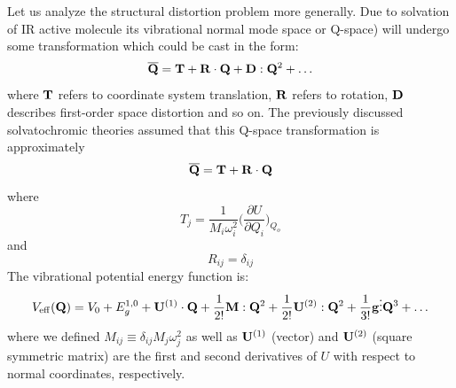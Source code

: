 \documentclass[a4paper,titlepage,twoside,fleqn,12pt]{book}
\newcommand{\FDer}[3]{\ensuremath{
\bigg(
\frac{\partial #1}{\partial #2}
\bigg)_{#3}}}
\begin{document}
\begin{refsection}
Let us analyze the structural distortion problem more generally.
Due to solvation of IR active molecule its vibrational normal mode space 
or Q-space) will
undergo some transformation which could be cast in the form:
%
\begin{equation}\label{Q-space-transform}
{\bf \overline{Q}} = {\bf T} + {\bf R} \cdot {\bf Q} + {\bf D} : {\bf Q}^2 + \ldots
\end{equation}
%
where ${\bf T}$ refers to coordinate system translation, ${\bf R}$ refers to rotation,
${\bf D}$ describes first\hyp{}order space distortion and so on. The previously
discussed solvatochromic theories assumed that this Q-space transformation is approximately
%
\begin{equation}\label{Q-space-transform-theory-0}
{\bf \overline{Q}} = {\bf T} + {\bf R} \cdot {\bf Q}
\end{equation}
%
where 
%
\begin{equation}\label{T-th-0}
T_j = \frac{1}{M_i\omega_i^2}\FDer{U}{Q_i}{Q_o}
\end{equation}
and
\begin{equation}\label{R-th-0}
R_{ij} = \delta_{ij}
\end{equation}
%
The vibrational potential energy function is:
%
\begin{equation}\label{V}
V_{\rm eff} ({\bf Q})
= V_0 + E^{\rm 1,0}_g + {\bf U}^{(1)} \cdot {\bf Q} + \frac{1}{2!} {\bf M} : {\bf Q}^2 + 
\frac{1}{2!} {\bf U}^{(2)} : {\bf Q}^2 + \frac{1}{3!} {\bf g} \vdots {\bf Q}^3 + \ldots
\end{equation}
%
where we defined $M_{ij} \equiv \delta_{ij}M_j\omega_j^2$
as well as ${\bf U}^{(1)}$ (vector) and ${\bf U}^{(2)}$ (square symmetric matrix) 
are the first and second derivatives
of $U$ with respect to normal coordinates, respectively.


\end{refsection}
\end{document}
